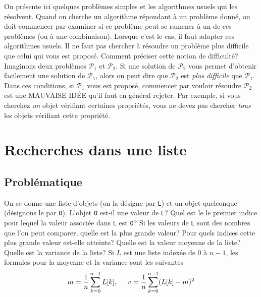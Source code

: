 

On présente ici quelques problèmes simples et les algorithmes usuels qui les résolvent.\newline
Quand on cherche un algorithme répondant à un problème donné, on doit commencer par examiner si ce problème peut se ramener à un de ces problèmes (ou à une combinaison). Lorsque c'est le cas, il faut adapter ces algorithmes usuels.\newline
Il ne faut pas chercher à résoudre un problème plus difficile que celui qui vous est proposé. Comment préciser cette notion de difficulté?\newline
Imaginons deux problèmes $\mathcal{P}_1$ et $\mathcal{P}_2$. Si une solution de $\mathcal{P}_2$ vous permet d'obtenir facilement une solution de $\mathcal{P}_1$, alors on peut dire que $\mathcal{P}_2$ est \emph{plus difficile} que $\mathcal{P}_1$. Dans ces conditions, si $\mathcal{P}_1$ vous est proposé, commencer par vouloir résoudre $\mathcal{P}_2$ est une MAUVAISE ID\'EE qu'il faut en général rejeter.  Par exemple, si vous cherchez \emph{un} objet vérifiant certaines propriétés, vous ne devez pas chercher \emph{tous} les objets vérifiant cette propriété.
\section{Recherches dans une liste} 
\subsection{Problématique}
On se donne une liste d'objets (on la désigne par \texttt{L}) et un objet quelconque (désignons le par \verb|O|). L'objet \verb|O| est-il une valeur de \texttt{L}? Quel est le le premier indice pour lequel la valeur associée dans \texttt{L} est \verb|O|?\newline
Si les valeurs de \texttt{L} sont des nombres que l'on peut comparer, quelle est la plus grande valeur? Pour quels indices cette plus grande valeur est-elle atteinte?  Quelle est la valeur moyenne de la liste? Quelle est la variance de la liste?\newline
Si $L$ est une liste indexée de $0$ à $n-1$, les formules pour la moyenne et la variance sont les suivantes
\begin{displaymath}
  m = \frac{1}{n}\sum_{k=0}^{n-1}L[k], \hspace{0.5cm}
  v = \frac{1}{n}\sum_{k=0}^{n-1}(L[k]-m)^2
\end{displaymath}

